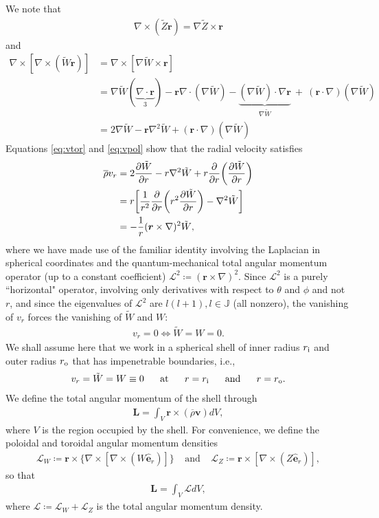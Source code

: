 \documentclass[12pt]{article} %
\newcommand{\pderiv}[2]{\frac{\partial#1}{\partial#2}}
\newcommand{\andd}{\text{and}\ \ \ \ \ }
\newcommand{\tz}{\tilde{Z}}
\newcommand{\tw}{\tilde{W}}
\newcommand{\five}{\ \ \ \ \ }
\newcommand{\rhobar}{\overline{\rho}}
\newcommand{\curl}{\nabla\times}
\newcommand{\er}{\hat{\bm{e}}_r}
\newcommand{\Div}{\nabla\cdot}
\newcommand{\ri}{r_{\rm{i}}}
\newcommand{\ro}{r_{\rm{o}}}
\begin{document}
We note that 
\begin{align}
\curl(\tz\bm{r}) =\nabla \tz \times \bm{r}
\label{eq:vtor}
\end{align}
and
\begin{align}
\curl[\curl({\tw\bm{r}})] &= \curl[\nabla \tw \times \bm{r}]\nonumber\\
&=\nabla\tw(\underbrace{\Div\bm{r}}_{3}) - \bm{r}\Div(\nabla\tw) - \underbrace{(\nabla\tw)\cdot\nabla\bm{r}}_{\nabla\tw}\
+\ (\bm{r}\cdot\nabla)(\nabla\tw)\nonumber\\
&=2\nabla\tw - \bm{r}\nabla^2\tw + (\bm{r}\cdot\nabla)(\nabla\tw)
\label{eq:vpol}
\end{align}
Equations \eqref{eq:vtor} and \eqref{eq:vpol} show that the radial velocity satisfies 
\begin{align}
\rhobar v_r &= 2\pderiv{\tw}{r} - r\nabla^2\tw + r\pderiv{}{r}\bigg{(}\pderiv{\tw}{r}\bigg{)}\nonumber\\
&= r\bigg{[}\frac{1}{r^2}\pderiv{}{r}\bigg{(}r^2\pderiv{\tw}{r}\bigg{)} - \nabla^2\tw\bigg{]}\nonumber\\
&= -\frac{1}{r}(\bm{r}\times\nabla)^2\tw, 
\end{align}
where we have made use of the familiar identity involving the Laplacian in spherical coordinates and the quantum-mechanical total angular momentum operator (up to a constant coefficient) $\mathscr{L}^2 \coloneqq (\bm{r}\times\nabla)^2$. Since $\mathscr{L}^2$ is a purely ``horizontal" operator, involving only derivatives with respect to $\theta$ and $\phi$ and not $r$, and since the eigenvalues of $\mathscr{L}^2$ are $l(l+1), l\in\mathbb{J}$ (all nonzero), the vanishing of $v_r$ forces the vanishing of $\tw$ and $W$:
\begin{align}
v_r = 0 \Longleftrightarrow \tw = W = 0. 
\label{eq:vr0w0}
\end{align}
We shall assume here that we work in a spherical shell of inner radius $\ri$ and outer radius $\ro$ that has impenetrable boundaries, i.e.,
\begin{align}
v_r = \tw = W \equiv 0\five\text{at}\five r=\ri\five\andd r=\ro.
\label{eq:w0}
\end{align}
We define the total angular momentum of the shell through
\begin{align}
\bm{L} = \int_V \bm{r}\times(\rhobar\bm{v})dV,
\end{align}
where $V$ is the region occupied by the shell. For convenience, we define the poloidal and toroidal angular momentum densities
\begin{align}
\bm{\mathcal{L}}_W \coloneqq \bm{r}\times\{\curl[\curl(W\er)]\}\five\andd \bm{\mathcal{L}}_Z \coloneqq \bm{r}\times[\curl(Z\er)],
\end{align}
so that 
\begin{align}
\bm{L} = \int_V \bm{\mathcal{L}}dV,
\end{align}
where $\bm{\mathcal{L}} \coloneqq \bm{\mathcal{L}}_W + \bm{\mathcal{L}}_Z$ is the total angular momentum density. 
\end{document}
